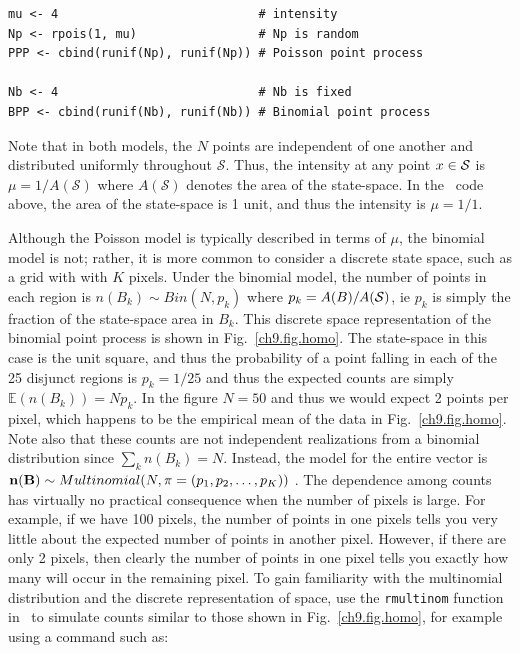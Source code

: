 \begin{center} %
\begin{verbatim}
mu <- 4                            # intensity
Np <- rpois(1, mu)                 # Np is random
PPP <- cbind(runif(Np), runif(Np)) # Poisson point process

Nb <- 4                            # Nb is fixed
BPP <- cbind(runif(Nb), runif(Nb)) # Binomial point process
\end{verbatim}
\end{center}

Note that in both models, the $N$ points are independent
of one another and distributed uniformly
throughout $\mathcal{S}$. Thus, the intensity at any point $x \in
\cal{S}$ is $\mu = 1 / A(\mathcal{S})$ where $A(\mathcal{S})$ denotes
the area of the state-space. In the \R~code above, the area of the
state-space is 1 unit, and thus the intensity is $\mu = 1/1$.

Although the Poisson model is typically described in terms of $\mu$,
the binomial model is not; rather, it
is more common to consider a discrete state space, such as a grid with
with $K$ pixels. Under the binomial model, the number of points in
each region is $n(B_k) \sim Bin(N, p_k)$
where $p_k = A(B)/A(\cal{S})$, ie $p_k$ is simply the fraction of
the state-space area in $B_k$. This discrete space representation of
the binomial point process is shown in Fig.~\ref{ch9.fig.homo}. The
state-space in this case is the unit square, and thus the probability of a
point falling in each of the 25 disjunct regions is $p_k = 1/25$ and
thus the expected counts are simply $\mathbb{E}(n(B_k)) = Np_k$. In
the figure $N=50$ and thus we would expect 2 points per pixel, which
happens to be the empirical mean of the data in
Fig.~\ref{ch9.fig.homo}. Note also that these counts are not
independent realizations from a binomial distribution since $\sum_k
n(B_k) = N$. Instead, the model for the entire vector
is ${\bf n(B)} \sim Multinomial(N, {\mathbf{\pi}} = (p_1, p_2, \dots,
p_K))$ \citep{illian_etal:2008}. The dependence among counts has virtually
no practical consequence when the number of pixels is large. For
example, if we have 100 pixels, the number of points in one pixels
tells you very little about the expected number of points in another
pixel. However, if there are only 2 pixels, then clearly the number of
points in one pixel tells you exactly how many will occur in the
remaining pixel. To gain familiarity with the multinomial distribution
and the discrete representation of space, use the \verb+rmultinom+
function in \R~to simulate counts similar to those shown in
Fig.~\ref{ch9.fig.homo}, for example using a command
such as:

